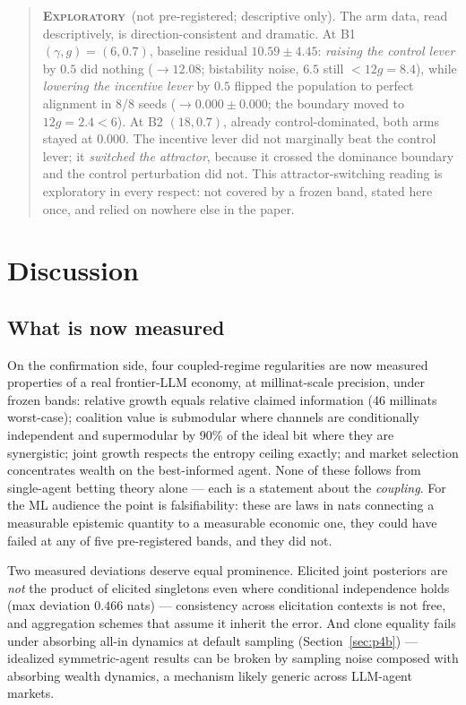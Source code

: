 \documentclass{article} %
\newcommand{\expl}{\textbf{\textsc{Exploratory}}}
\newcommand{\explbox}[1]{\begin{quote}\small\expl\ (not pre-registered; descriptive only). #1\end{quote}}
\begin{document}
\explbox{The arm data, read descriptively, is direction-consistent and dramatic. At B1 $(\gamma, g) = (6, 0.7)$, baseline residual $10.59 \pm 4.45$: \emph{raising the control lever} by $0.5$ did nothing ($\to 12.08$; bistability noise, $6.5$ still $< 12g = 8.4$), while \emph{lowering the incentive lever} by $0.5$ flipped the population to perfect alignment in 8/8 seeds ($\to 0.000 \pm 0.000$; the boundary moved to $12g = 2.4 < 6$). At B2 $(18, 0.7)$, already control-dominated, both arms stayed at $0.000$. The incentive lever did not marginally beat the control lever; it \emph{switched the attractor}, because it crossed the dominance boundary and the control perturbation did not. This attractor-switching reading is exploratory in every respect: not covered by a frozen band, stated here once, and relied on nowhere else in the paper.}

\section{Discussion}
\label{sec:discussion}

\subsection{What is now measured}

On the confirmation side, four coupled-regime regularities are now measured properties of a real frontier-LLM economy, at millinat-scale precision, under frozen bands: relative growth equals relative claimed information (46 millinats worst-case); coalition value is submodular where channels are conditionally independent and supermodular by 90\% of the ideal bit where they are synergistic; joint growth respects the entropy ceiling exactly; and market selection concentrates wealth on the best-informed agent. None of these follows from single-agent betting theory \citep{kelly1956,barron1988} alone --- each is a statement about the \emph{coupling}. For the ML audience the point is falsifiability: these are laws in nats connecting a measurable epistemic quantity to a measurable economic one, they could have failed at any of five pre-registered bands, and they did not.

Two measured deviations deserve equal prominence. Elicited joint posteriors are \emph{not} the product of elicited singletons even where conditional independence holds (max deviation $0.466$ nats) --- consistency across elicitation contexts is not free, and aggregation schemes that assume it inherit the error. And clone equality fails under absorbing all-in dynamics at default sampling (Section~\ref{sec:p4b}) --- idealized symmetric-agent results can be broken by sampling noise composed with absorbing wealth dynamics, a mechanism likely generic across LLM-agent markets.
\end{document}

